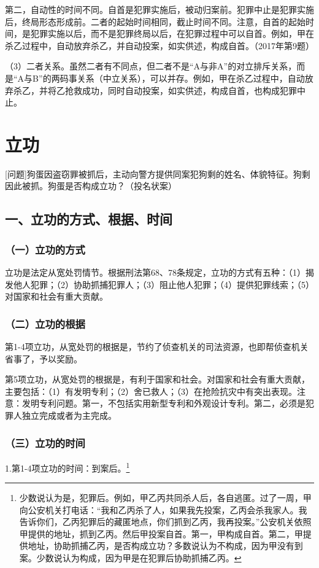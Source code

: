 第二，自动性的时间不同。自首是犯罪实施后，被动归案前。犯罪中止是犯罪实施后，终局形态形成前。二者的起始时间相同，截止时间不同。注意，自首的起始时间，是犯罪实施以后，而不是犯罪终局以后，在犯罪过程中可以自首。例如，甲在杀乙过程中，自动放弃杀乙，并自动投案，如实供述，构成自首。（2017年第9题）

（3）二者关系。虽然二者有不同点，但二者不是“A与非A”的对立排斥关系，而是“A与B”的两码事关系（中立关系），可以并存。例如，甲在杀乙过程中，自动放弃杀乙，并将乙抢救成功，同时自动投案，如实供述，构成自首，也构成犯罪中止。

\section{立功}

[问题]狗蛋因盗窃罪被抓后，主动向警方提供同案犯狗剩的姓名、体貌特征。狗剩因此被抓。狗蛋是否构成立功？（投名状案）

\subsection*{一、立功的方式、根据、时间}

\subsubsection*{（一）立功的方式}

立功是法定从宽处罚情节。根据刑法第68、78条规定，立功的方式有五种：（1）揭发他人犯罪；（2）协助抓捕犯罪人；（3）阻止他人犯罪；（4）提供犯罪线索；（5）对国家和社会有重大贡献。

\subsubsection*{（二）立功的根据}

第1-4项立功，从宽处罚的根据是，节约了侦查机关的司法资源，也即帮侦查机关省事了，予以奖励。

第5项立功，从宽处罚的根据是，有利于国家和社会。对国家和社会有重大贡献，主要包括：（1）有发明专利；（2）舍已救人；（3）在抢险抗灾中有突出表现。注意：发明专利问题。第一，不包括实用新型专利和外观设计专利。第二，必须是犯罪人独立完成或者为主完成。

\subsubsection*{（三）立功的时间}

1.第1-4项立功的时间：到案后。\footnote{少数说认为是，犯罪后。例如，甲乙丙共同杀人后，各自逃匿。过了一周，甲向公安机关打电话：“我和乙丙杀了人，如果我先投案，乙丙会杀我家人。我告诉你们，乙丙犯罪后的藏匿地点，你们抓到乙丙，我再投案。”公安机关依照甲提供的地址，抓到乙丙。然后甲投案自首。第一，甲构成自首。第二，甲提供地址，协助抓捕乙丙，是否构成立功？多数说认为不构成，因为甲没有到案。少数说认为构成，因为甲是在犯罪后协助抓捕乙丙。}

